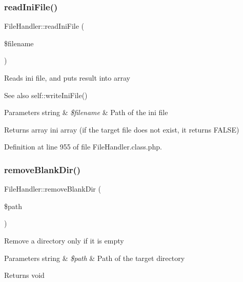 \mbox{\label{classFileHandler_a58a8bbae1ab4acb358599db38a47db4d}} 
\subsubsection{\texorpdfstring{read\+Ini\+File()}{readIniFile()}}
{\footnotesize\ttfamily File\+Handler\+::read\+Ini\+File (\begin{DoxyParamCaption}\item[{}]{\$filename }\end{DoxyParamCaption})}

Reads ini file, and puts result into array

\begin{DoxySeeAlso}{See also}
self\+::write\+Ini\+File() 
\end{DoxySeeAlso}

\begin{DoxyParams}[1]{Parameters}
string & {\em \$filename} & Path of the ini file \\
\hline
\end{DoxyParams}
\begin{DoxyReturn}{Returns}
array ini array (if the target file does not exist, it returns F\+A\+L\+SE) 
\end{DoxyReturn}


Definition at line 955 of file File\+Handler.\+class.\+php.

\mbox{\label{classFileHandler_a538bfd50008250786985c7da4ff768f1}} 
\subsubsection{\texorpdfstring{remove\+Blank\+Dir()}{removeBlankDir()}}
{\footnotesize\ttfamily File\+Handler\+::remove\+Blank\+Dir (\begin{DoxyParamCaption}\item[{}]{\$path }\end{DoxyParamCaption})}

Remove a directory only if it is empty


\begin{DoxyParams}[1]{Parameters}
string & {\em \$path} & Path of the target directory \\
\hline
\end{DoxyParams}
\begin{DoxyReturn}{Returns}
void 
\end{DoxyReturn}


